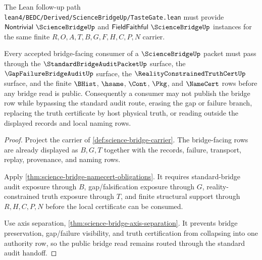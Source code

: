 The Lean follow-up path \texttt{lean4/BEDC/Derived/ScienceBridgeUp/TasteGate.lean} must provide $\mathsf{Nontrivial}\ \ScienceBridgeUp$ and $\mathsf{FieldFaithful}\ \ScienceBridgeUp$ instances for the same finite $R,O,A,T,B,G,F,H,C,P,N$ carrier.

\begin{theorem}
\label{thm:science-bridge-standard-audit-handoff}
Every accepted bridge-facing consumer of a $\ScienceBridgeUp$ packet must pass through the $\StandardBridgeAuditPacketUp$ surface, the $\GapFailureBridgeAuditUp$ surface, the $\RealityConstrainedTruthCertUp$ surface, and the finite $\BHist$, $\hsame$, $\Cont$, $\Pkg$, and $\NameCert$ rows before any bridge read is public. Consequently a consumer may not publish the bridge row while bypassing the standard audit route, erasing the gap or failure branch, replacing the truth certificate by host physical truth, or reading outside the displayed records and local naming rows.
\end{theorem}
\begin{proof}
Project the carrier of \autoref{def:science-bridge-carrier}. The bridge-facing rows are already displayed as $B,G,T$ together with the records, failure, transport, replay, provenance, and naming rows.

Apply \autoref{thm:science-bridge-namecert-obligations}. It requires standard-bridge audit exposure through $B$, gap/falsification exposure through $G$, reality-constrained truth exposure through $T$, and finite structural support through $R,H,C,P,N$ before the local certificate can be consumed.

Use axis separation, \autoref{thm:science-bridge-axis-separation}. It prevents bridge preservation, gap/failure visibility, and truth certification from collapsing into one authority row, so the public bridge read remains routed through the standard audit handoff.
\end{proof}

